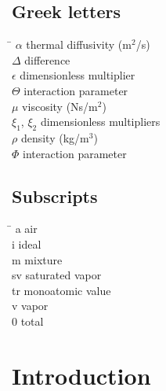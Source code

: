 \documentclass[11pt]{article}
\begin{document}
\subsection*{Greek letters}
\begin{tabbing}
\hspace{3.6cm}\= \kill
$\alpha$ \> thermal diffusivity (m$^2$/s) \\
$\Delta$ \> difference \\
$\epsilon$ \> dimensionless multiplier \\
$\Theta$ \> interaction parameter \\
$\mu$ \> viscosity (Ns/m$^2$) \\
$\xi_1$, $\xi_2$ \> dimensionless multipliers \\
$\rho$ \> density (kg/m$^3$) \\
$\Phi$ \> interaction parameter
\end{tabbing}

\subsection*{Subscripts}
\begin{tabbing}
\hspace{1.6cm}\= \kill
a  \> air \\
i  \> ideal \\
m  \> mixture \\
sv \> saturated vapor \\
tr \> monoatomic value \\
v  \> vapor \\
0  \> total
\end{tabbing}

\section{Introduction}
\end{document}
